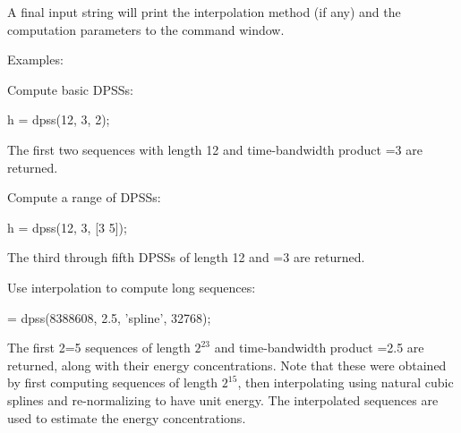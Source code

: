 A final input string  will print the interpolation method (if any) and the computation parameters to the command window.
\bigskip

\noindent Examples:
\medskip

\noindent Compute basic DPSSs:
\begin{texiexample}
    h = dpss(12, 3, 2); 
\end{texiexample}
The first two sequences with length 12 and time-bandwidth product =3 are returned.
\medskip

\noindent Compute a range of DPSSs:
\begin{texiexample}
    h = dpss(12, 3, [3 5]); 
\end{texiexample}
The third through fifth DPSSs of length 12 and =3 are returned.
\medskip

\noindent Use interpolation to compute long sequences:
\begin{texiexample}
    [h, l] = dpss(8388608, 2.5, 'spline', 32768); 
\end{texiexample}
\noindent The first 2=5 sequences of length $2^{23}$ and time-bandwidth product =2.5 are returned, along with their energy concentrations.  Note that these were obtained by first computing sequences of length $2^{15}$, then interpolating using natural cubic splines and re-normalizing to have unit energy.  The interpolated sequences are used to estimate the energy concentrations.


